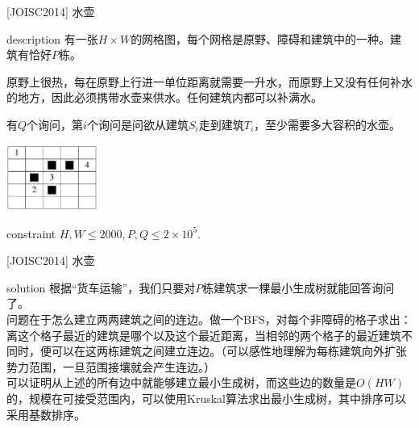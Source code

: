 \documentclass{beamer}
\def\le{\leqslant}
\begin{document}
\begin{frame}{[JOISC2014] 水壶}
	\begin{block}{description}
		有一张$H \times W$的网格图，每个网格是原野、障碍和建筑中的一种。建筑有恰好$P$栋。
		
		原野上很热，每在原野上行进一单位距离就需要一升水，而原野上又没有任何补水的地方，因此必须携带水壶来供水。任何建筑内都可以补满水。
		
		有$Q$个询问，第$i$个询问是问欲从建筑$S_i$走到建筑$T_i$，至少需要多大容积的水壶。
		\begin{center}
			\includegraphics[width=3.0cm]{joisc2014.png}
		\end{center}
	\end{block}
	\begin{block}{constraint}
		$H, W \le 2000, P, Q \le 2 \times 10^5.$
	\end{block}
\end{frame}
\begin{frame}{[JOISC2014] 水壶}
	\begin{block}{solution}
		根据“货车运输”，我们只要对$P$栋建筑求一棵最小生成树就能回答询问了。\\
		
		问题在于怎么建立两两建筑之间的连边。做一个BFS，对每个非障碍的格子求出：离这个格子最近的建筑是哪个以及这个最近距离，当相邻的两个格子的最近建筑不同时，便可以在这两栋建筑之间建立连边。（可以感性地理解为每栋建筑向外扩张势力范围，一旦范围接壤就会产生连边。）\\
		
		可以证明从上述的所有边中就能够建立最小生成树，而这些边的数量是$O(HW)$的，规模在可接受范围内，可以使用Kruskal算法求出最小生成树，其中排序可以采用基数排序。		
	\end{block}
\end{frame}
\end{document}
